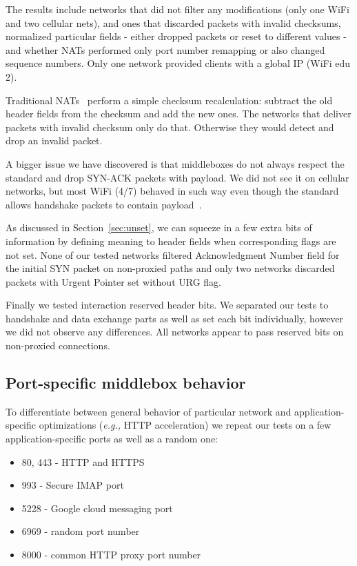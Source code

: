 \documentclass{sig-alternate-10pt}
\providecommand{\eg}{\emph{e.g.,} }
\begin{document}
The results include networks that did not filter any modifications (only one WiFi and two cellular nets), and ones that discarded packets with invalid checksums, normalized particular fields - either dropped packets or reset to different values - and whether NATs performed only port number remapping or also changed sequence numbers. Only one network provided clients with a global IP (WiFi edu 2).

Traditional NATs~\cite{Egevang:tu} perform a simple checksum recalculation: subtract the old header fields from the checksum and add the new ones. The networks that deliver packets with invalid checksum only do that. Otherwise they would detect and drop an invalid packet.

A bigger issue we have discovered is that middleboxes do not always respect the standard and drop SYN-ACK packets with payload. We did not see it on cellular networks, but most WiFi (4/7) behaved in such way even though the standard allows handshake packets to contain payload~\cite{Postel:3EDyoxP_,Chu:2011tn}.


As discussed in Section~\ref{sec:unset}, we can squeeze in a few extra bits of information by defining meaning to header fields when corresponding flags are not set. None of our tested networks filtered Acknowledgment Number field for the initial SYN packet on non-proxied paths and only two networks discarded packets with Urgent Pointer set without URG flag.

Finally we tested interaction reserved header bits. We separated our tests to handshake and data exchange parts as well as set each bit individually, however we did not observe any differences. All networks appear to pass reserved bits on non-proxied connections.


\subsection{Port-specific middlebox behavior}
\label{sec:portspec}

To differentiate between general behavior of particular network and application-specific optimizations (\eg HTTP acceleration) we repeat our tests on a few application-specific ports as well as a random one:
\begin{itemize}
    \item 80, 443 - HTTP and HTTPS
    \item 993 - Secure IMAP port
    \item 5228 - Google cloud messaging port
    \item 6969 - random port number
    \item 8000 - common HTTP proxy port number
\end{itemize}
\end{document}
